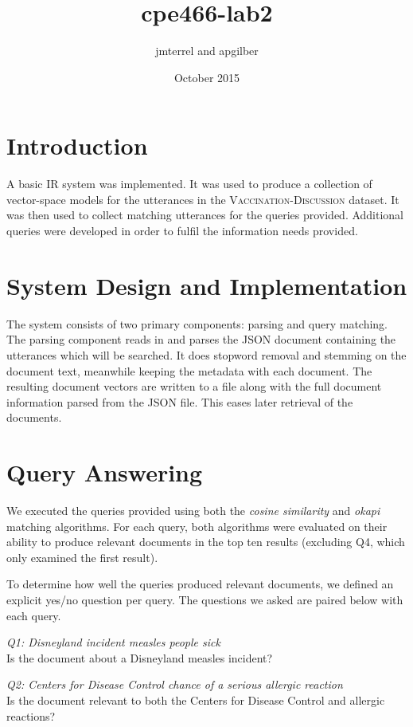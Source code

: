 \documentclass{article}
\title{cpe466-lab2}
\author{jmterrel and apgilber}
\date{October 2015}
\begin{document}
\maketitle

\section{Introduction}
A basic IR system was implemented. It was used to produce a collection of vector-space models for the utterances in the \textsc{Vaccination-Discussion} dataset. It was then used to collect matching utterances for the queries provided. Additional queries were developed in order to fulfil the information needs provided.

\section{System Design and Implementation}
The system consists of two primary components: parsing and query matching.
The parsing component reads in and parses the JSON document containing the utterances which will be searched. It does stopword removal and stemming on the document text, meanwhile keeping the metadata with each document. The resulting document vectors are written to a file along with the full document information parsed from the JSON file. This eases later retrieval of the documents.

\section{Query Answering}
We executed the queries provided using both the \textit{cosine similarity} and \textit{okapi} matching algorithms. For each query, both algorithms were evaluated on their ability to produce relevant documents in the top ten results (excluding Q4, which only examined the first result).

To determine how well the queries produced relevant documents, we defined an explicit yes/no question per query. The questions we asked are paired below with each query.

\hfill

\noindent
\textit{Q1: Disneyland incident measles people sick}
\\
Is the document about a Disneyland measles incident?

\noindent
\textit{Q2: Centers for Disease Control chance of a serious allergic reaction}
\\
Is the document relevant to both the Centers for Disease Control and allergic reactions?
\end{document}
